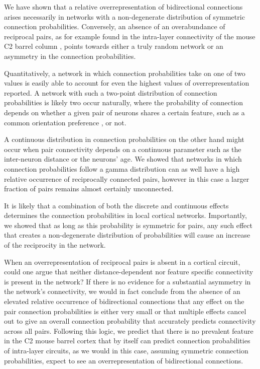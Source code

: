 
We have shown that a relative overrepresentation of bidirectional connections arises necessarily in networks with a non-degenerate distribution of symmetric connection probabilities. Conversely, an absence of an overabundance of reciprocal pairs, as for example found in the intra-layer connectivity of the mouse C2 barrel column \cite{Lefort2009}, points towards either a truly random network or an asymmetry in the connection probabilities. 

Quantitatively, a network in which connection probabilities take on one of two values is easily able to account for even the highest values of overrepresentation reported. A network with such a two-point distribution of connection probabilities is likely two occur naturally, where the probability of connection depends on whether a given pair of neurons shares a certain feature, such as a common orientation preference \cite{Lee2016}, or not. 

A continuous distribution in connection probabilities on the other hand might occur when pair connectivity depends on a continuous parameter such as the inter-neuron distance or the neurons' age. We showed that networks in which connection probabilities follow a gamma distribution can as well have a high relative occurrence of reciprocally connected pairs, however in this case a larger fraction of pairs remains almost certainly unconnected.

It is likely that a combination of both the discrete and continuous effects determines the connection probabilities in local cortical networks. Importantly, we showed that as long as this probability is symmetric for pairs, any such effect that creates a non-degenerate distribution of probabilities will cause an increase of the reciprocity in the network.

When an overrepresentation of reciprocal pairs is absent in a cortical circuit, could one argue that neither distance-dependent nor feature specific connectivity is present in the network? If there is no evidence for a substantial asymmetry in the network's connectivity, we would in fact conclude from the absence of an elevated relative occurrence of bidirectional connections that any effect on the pair connection probabilities is either very small or that multiple effects cancel out to give an overall connection probability that accurately predicts connectivity across all pairs. Following this logic, we predict that there is no prevalent feature in the C2 mouse barrel cortex that by itself can predict connection probabilities of intra-layer circuits, as we would in this case, assuming symmetric connection probabilities, expect to see an overrepresentation of bidirectional connections.

